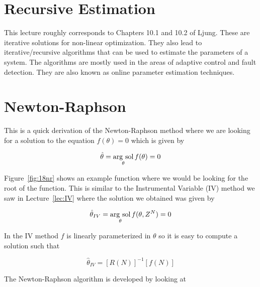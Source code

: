 \mainmatter%
\setcounter{page}{1}

\lectureseries[\course]{\course}

\date{December 1, 2009}

\setaddress%

\setcounter{lecture}{17}
\setcounter{chapter}{17}


\section{Recursive Estimation}
This lecture roughly corresponds to Chapters 10.1 and 10.2 of Ljung.
These are iterative solutions for non-linear optimization.
They also lead to iterative/recursive algorithms that can be used to estimate the parameters of a system.
The algorithms are mostly used in the areas of adaptive control and fault detection.
They are also known as online parameter estimation techniques.

\section{Newton-Raphson}
This is a quick derivation of the Newton-Raphson method where we are looking for a solution to the equation $f(\theta)=0$ which is given by

\begin{equation*}
\hat{\theta} = \mathop{\arg\,\text{sol}}\limits_\theta f(\theta) = 0
\end{equation*}

Figure~\ref{fig:18nr} shows an example function where we would be looking for the root of the function.
This is similar to the Instrumental Variable (IV) method we saw in Lecture~\ref{lec:IV} where the solution we obtained was given by

\begin{equation*}
\hat{\theta}_{IV} = \mathop{\arg\,\text{sol}}\limits_\theta f(\theta,Z^N) = 0
\end{equation*}

In the IV method $f$ is linearly parameterized in $\theta$ so it is easy to compute a solution such that

\begin{equation*}
\hat{\theta}_{IV} = {[R(N)]}^{-1}[f(N)]
\end{equation*}

The Newton-Raphson algorithm is developed by looking at

